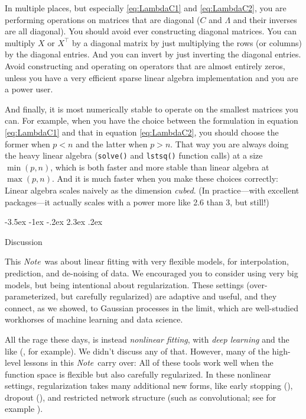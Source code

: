 \documentclass[12pt,letterpaper]{article}
\makeatletter
\renewcommand\section{\@startsection {section}{1}{\z@}%
  {-3.5ex \@plus -1ex \@minus -.2ex}%
  {2.3ex \@plus.2ex}%
  {\raggedright\normalfont\Large\bfseries}}
\newcommand{\documentname}{\textsl{Note}}
\newcommand{\code}[1]{\texttt{#1}}
\makeatother
\begin{document}
In multiple places, but especially \eqref{eq:LambdaC1} and \eqref{eq:LambdaC2}, you are performing operations on matrices that are diagonal ($C$ and $\Lambda$ and their inverses are all diagonal).
You should avoid ever constructing diagonal matrices.
You can multiply $X$ or $X^\top$ by a diagonal matrix by just multiplying the rows (or columns) by the diagonal entries.
And you can invert by just inverting the diagonal entries.
Avoid constructing and operating on operators that are almost entirely zeros, unless you have a very efficient sparse linear algebra implementation and you are a power user.

And finally, it is most numerically stable to operate on the smallest matrices you can.
For example, when you have the choice between the formulation in equation \eqref{eq:LambdaC1} and that in equation \eqref{eq:LambdaC2}, you should choose the former when $p<n$ and the latter when $p>n$.
That way you are always doing the heavy linear algebra (\code{solve()} and \code{lstsq()} function calls) at a size $\min(p, n)$, which is both faster and more stable than linear algebra at $\max(p, n)$. And it is much faster when you make these choices correctly:
Linear algebra scales naively as the dimension \emph{cubed}.
(In practice---with excellent packages---it actually scales with a power more like 2.6 than 3, but still!)

\section{Discussion}\label{sec:discussion}

This \documentname\ was about linear fitting with very flexible models, for interpolation, prediction, and de-noising of data.
We encouraged you to consider using very big models, but being intentional about regularization.
These settings (over-parameterized, but carefully regularized) are adaptive and useful, and they connect, as we showed, to Gaussian processes in the limit, which are well-studied workhorses of machine learning and data science.

All the rage these days, is instead \emph{nonlinear fitting}, with \emph{deep learning} and the like (\citealt{deep}, for example).
We didn't discuss any of that.
However, many of the high-level lessons in this \documentname\ carry over:
All of these tools work well when the function space is flexible but also carefully regularized.
In these nonlinear settings, regularization takes many additional new forms, like early stopping (\citealt{earlystop}), dropout (\citealt{dropout}), and restricted network structure (such as convolutional; see for example \citealt{bishop}).
\end{document}

